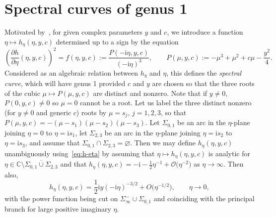 \section{Spectral curves of genus 1}
Motivated by~\cite[Section 4.3]{BuckinghamM22}, for given complex parameters $y$ and $c$, we introduce a function $\eta\mapsto h_\eta(\eta,y,c)$ determined up to a sign by the equation
\begin{equation}
\left(\frac{\partial h}{\partial \eta}(\eta,y,c)\right)^2=f(\eta,y,c):=\frac{P(-\mathrm{i}\eta,y,c)}{(-\mathrm{i}\eta)^3},\qquad P(\mu,y,c):=-\mu^3+\mu^2+c\mu-\frac{y^2}{4}.
\label{eq:h-eta}
\end{equation}
Considered as an algebraic relation between $h_\eta$ and $\eta$, this defines the \emph{spectral curve}, which will have genus 1 provided $c$ and $y$ are chosen so that the three roots of the cubic $\mu\mapsto P(\mu,y,c)$ are distinct and nonzero. Note that if $y\neq 0$, $P(0,y,c)\neq 0$ so $\mu=0$ cannot be a root. Let us label the three distinct nonzero (for $y\neq 0$ and generic $c$) roots by $\mu=s_j$, $j=1,2,3$, so that $P(\mu,y,c)=-(\mu-s_1)(\mu-s_2)(\mu-s_3)$. Let $\Sigma_{0,1}$ be an arc in the $\eta$-plane joining $\eta=0$ to $\eta=\mathrm{i} s_1$, let $\Sigma_{2,3}$ be an arc in the $\eta$-plane joining $\eta=\mathrm{i} s_2$ to $\eta=\mathrm{i} s_3$, and assume that $\Sigma_{0,1}\cap\Sigma_{2,3}=\varnothing$.
Then we may define $h_\eta(\eta,y,c)$ unambiguously using~\eqref{eq:h-eta} by assuming that $\eta\mapsto h_\eta(\eta,y,c)$ is analytic for $\eta\in\mathbb{C}\setminus\overline{\Sigma_{0,1}\cup\Sigma_{2,3}}$ and that $h_\eta(\eta,y,c)=-\mathrm{i} -\frac{1}{2}\eta^{-1} +\mathcal{O}\bigl(\eta^{-2}\bigr)$ as $\eta\to\infty$. Then also,
\begin{equation*}
h_\eta(\eta,y,c)=\frac{1}{2}\mathrm{i} y(-\mathrm{i}\eta)^{-3/2}+O\bigl(\eta^{-1/2}\bigr),\qquad \eta\to 0,
\label{eq:hprime-zero}
\end{equation*}
with the power function being cut on $\Sigma_\infty^-\cup\Sigma_{0,1}$ and coinciding with the principal branch for large positive imaginary $\eta$.

